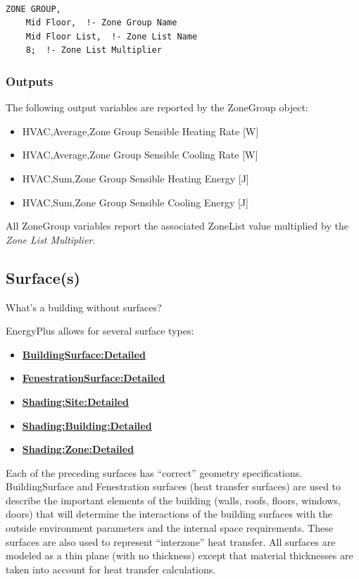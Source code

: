 \begin{lstlisting}

ZONE GROUP,
    Mid Floor,  !- Zone Group Name
    Mid Floor List,  !- Zone List Name
    8;  !- Zone List Multiplier
\end{lstlisting}

\subsubsection{Outputs}\label{outputs-2-023}

The following output variables are reported by the ZoneGroup object:

\begin{itemize}
\item
  HVAC,Average,Zone Group Sensible Heating Rate {[}W{]}
\item
  HVAC,Average,Zone Group Sensible Cooling Rate {[}W{]}
\item
  HVAC,Sum,Zone Group Sensible Heating Energy {[}J{]}
\item
  HVAC,Sum,Zone Group Sensible Cooling Energy {[}J{]}
\end{itemize}

All ZoneGroup variables report the associated ZoneList value multiplied by the \emph{Zone List Multiplier}.

\subsection{Surface(s)}\label{surfaces}

What's a building without surfaces?

EnergyPlus allows for several surface types:

\begin{itemize}
\item
  \textbf{\hyperref[buildingsurfacedetailed]{BuildingSurface:Detailed}}
\item
  \textbf{\hyperref[fenestrationsurfacedetailed]{FenestrationSurface:Detailed}}
\item
  \textbf{\hyperref[shadingsitedetailed-shadingbuildingdetailed]{Shading:Site:Detailed}}
\item
  \textbf{\hyperref[shadingsitedetailed-shadingbuildingdetailed]{Shading:Building:Detailed}}
\item
  \textbf{\hyperref[shadingzonedetailed-000]{Shading:Zone:Detailed}}
\end{itemize}

Each of the preceding surfaces has ``correct'' geometry specifications. BuildingSurface and Fenestration surfaces (heat transfer surfaces) are used to describe the important elements of the building (walls, roofs, floors, windows, doors) that will determine the interactions of the building surfaces with the outside environment parameters and the internal space requirements. These surfaces are also used to represent ``interzone'' heat transfer. All surfaces are modeled as a thin plane (with no thickness) except that material thicknesses are taken into account for heat transfer calculations.

